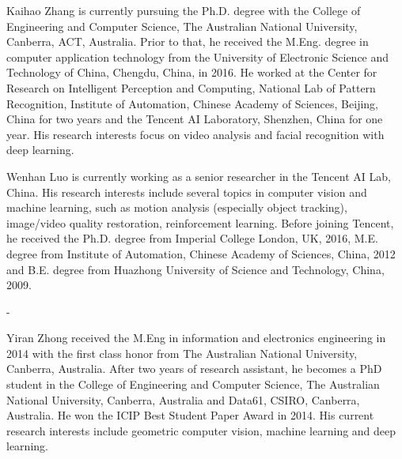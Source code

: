 \documentclass[journal]{IEEEtran}
\begin{document}

\begin{IEEEbiography}{Kaihao Zhang}
is currently pursuing the Ph.D. degree with the College of Engineering and Computer Science, The Australian National University, Canberra, ACT, Australia. Prior to that, he received the M.Eng. degree in computer application technology from the University of Electronic Science and Technology of China, Chengdu, China, in 2016. He worked at the Center for Research on Intelligent Perception and Computing, National Lab of Pattern Recognition, Institute of Automation, Chinese Academy of Sciences, Beijing, China for two years and the Tencent AI Laboratory, Shenzhen, China for one year. His research interests focus on video analysis and facial recognition with deep learning.
\end{IEEEbiography}


\begin{IEEEbiography}{Wenhan Luo}
is currently working as a senior researcher in the Tencent AI Lab, China. His research interests include several topics in computer vision and machine learning, such as motion analysis (especially object tracking), image/video quality restoration, reinforcement learning. Before joining Tencent, he received the Ph.D. degree from Imperial College London, UK, 2016, M.E. degree from Institute of Automation, Chinese Academy of Sciences, China, 2012 and B.E. degree from Huazhong University of Science and Technology, China, 2009.
\end{IEEEbiography}
-
\begin{IEEEbiography}{Yiran Zhong} received the M.Eng in information and electronics engineering in 2014 with the first class honor from The Australian National University, Canberra, Australia. After two years of research assistant, he becomes a PhD student in the College of Engineering and Computer Science, The Australian National University, Canberra, Australia and Data61, CSIRO, Canberra, Australia. He won the ICIP Best Student Paper Award in 2014. His current research interests include geometric computer vision, machine learning and deep learning.

\end{IEEEbiography}
\end{document}
